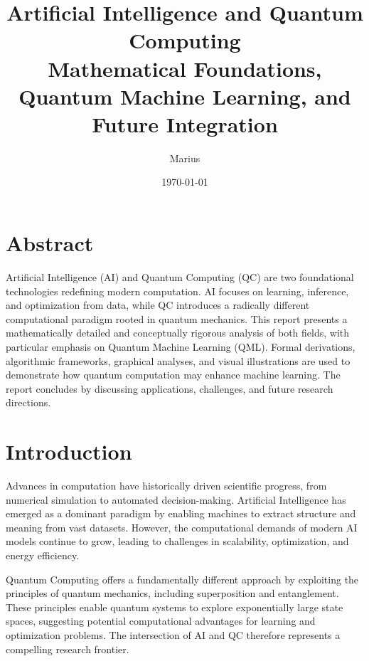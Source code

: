 \documentclass[11pt,a4paper]{article}
\title{\textbf{Artificial Intelligence and Quantum Computing}\\
\large Mathematical Foundations, Quantum Machine Learning, and Future Integration}
\author{Marius}
\date{\today}
\begin{document}
\maketitle
\newpage

\tableofcontents
\newpage

\section*{Abstract}

Artificial Intelligence (AI) and Quantum Computing (QC) are two foundational technologies redefining modern computation. AI focuses on learning, inference, and optimization from data, while QC introduces a radically different computational paradigm rooted in quantum mechanics. This report presents a mathematically detailed and conceptually rigorous analysis of both fields, with particular emphasis on Quantum Machine Learning (QML). Formal derivations, algorithmic frameworks, graphical analyses, and visual illustrations are used to demonstrate how quantum computation may enhance machine learning. The report concludes by discussing applications, challenges, and future research directions.

\newpage

\section{Introduction}

Advances in computation have historically driven scientific progress, from numerical simulation to automated decision-making. Artificial Intelligence has emerged as a dominant paradigm by enabling machines to extract structure and meaning from vast datasets. However, the computational demands of modern AI models continue to grow, leading to challenges in scalability, optimization, and energy efficiency.

Quantum Computing offers a fundamentally different approach by exploiting the principles of quantum mechanics, including superposition and entanglement. These principles enable quantum systems to explore exponentially large state spaces, suggesting potential computational advantages for learning and optimization problems. The intersection of AI and QC therefore represents a compelling research frontier.

\newpage
\end{document}

